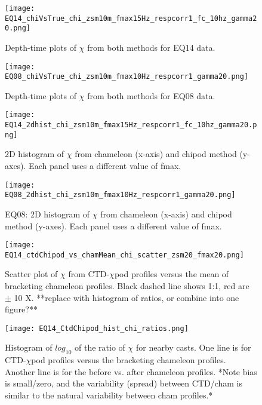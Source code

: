 \documentclass{ametsoc}
\begin{document}
\begin{figure}[t]
  \noindent\texttt{[image: EQ14\_chiVsTrue\_chi\_zsm10m\_fmax15Hz\_respcorr1\_fc\_10hz\_gamma20.png]}\\
  \caption{Depth-time plots of $\chi$ from both methods for EQ14 data.}
  \label{eq14_eps_pcolor}
\end{figure}


\begin{figure}[t]
  \noindent\texttt{[image: EQ08\_chiVsTrue\_chi\_zsm10m\_fmax10Hz\_respcorr1\_gamma20.png]}\\
  \caption{Depth-time plots of $\chi$ from both methods for EQ08 data.}
  \label{eq08_eps_pcolor}
\end{figure}


\begin{figure}[t]
  \noindent\texttt{[image: EQ14\_2dhist\_chi\_zsm10m\_fmax15Hz\_respcorr1\_fc\_10hz\_gamma20.png]}\\
  \caption{2D histogram of $\chi$ from chameleon (x-axis) and chipod method (y-axes). Each panel uses a different value of fmax.}
  \label{eq14_chi_2dhist}
\end{figure}


\begin{figure}[t]
  \noindent\texttt{[image: EQ08\_2dhist\_chi\_zsm10m\_fmax10Hz\_respcorr1\_gamma20.png]}\\
  \caption{EQ08: 2D histogram of $\chi$ from chameleon (x-axis) and chipod method (y-axes). Each panel uses a different value of fmax.}
  \label{eq08_chi_2dhist}
\end{figure}


\begin{figure}[t]
  \noindent\texttt{[image: EQ14\_ctdChipod\_vs\_chamMean\_chi\_scatter\_zsm20\_fmax20.png]}\\
  \caption{Scatter plot of $\chi$ from CTD-$\chi$pod profiles versus the mean of bracketing chameleon profiles. Black dashed line shows 1:1, red are $\pm$ 10 X. **replace with histogram of ratios, or combine into one figure?**}
  \label{eq14_cdtChi_vs_cham}
\end{figure}


\begin{figure}[t]
  \noindent\texttt{[image: EQ14\_CtdChipod\_hist\_chi\_ratios.png]}\\
  \caption{Histogram of $log_{10}$ of the ratio of $\chi$ for nearby casts. One line is for CTD-$\chi$pod profiles versus the bracketing chameleon profiles. Another line is for the before vs. after chameleon profiles. *Note bias is small/zero, and the variability (spread) between CTD/cham is similar to the natural variability between cham profiles.*}
  \label{eq14_cdtChi_vs_cham_hist}
\end{figure}
\end{document}
